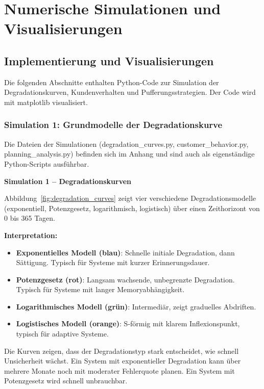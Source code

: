 \documentclass[12pt, a4paper, titlepage]{report}
\theoremstyle{definition}
\theoremstyle{remark}
\begin{document}
\chapter{Numerische Simulationen und Visualisierungen}
\label{sec:simul}

\section{Implementierung und Visualisierungen}

Die folgenden Abschnitte enthalten Python-Code zur Simulation der Degradationskurven, Kundenverhalten und Pufferungsstrategien. Der Code wird mit matplotlib visualisiert.

\subsection{Simulation 1: Grundmodelle der Degradationskurve}

Die Dateien der Simulationen (degradation\_curves.py, customer\_behavior.py, planning\_analysis.py) befinden sich im Anhang und sind auch als eigenständige Python-Scripts ausführbar.

\textbf{Simulation 1 – Degradationskurven}

Abbildung~\ref{fig:degradation_curves} zeigt vier verschiedene Degradationsmodelle (exponentiell, Potenzgesetz, logarithmisch, logistisch) über einen Zeithorizont von 0 bis 365 Tagen.

\textbf{Interpretation:}
\begin{itemize}
  \item \textbf{Exponentielles Modell (blau)}: Schnelle initiale Degradation, dann Sättigung. Typisch für Systeme mit kurzer Erinnerungsdauer.
  
  \item \textbf{Potenzgesetz (rot)}: Langsam wachsende, unbegrenzte Degradation. Typisch für Systeme mit langer Memoryabhängigkeit.
  
  \item \textbf{Logarithmisches Modell (grün)}: Intermediär, zeigt graduelles Abdriften.
  
  \item \textbf{Logistisches Modell (orange)}: S-förmig mit klarem Inflexionspunkt, typisch für adaptive Systeme.
\end{itemize}

Die Kurven zeigen, dass der Degradationstyp stark entscheidet, wie schnell Unsicherheit wächst. Ein System mit exponentieller Degradation kann über mehrere Monate noch mit moderater Fehlerquote planen. Ein System mit Potenzgesetz wird schnell unbrauchbar.
\end{document}
